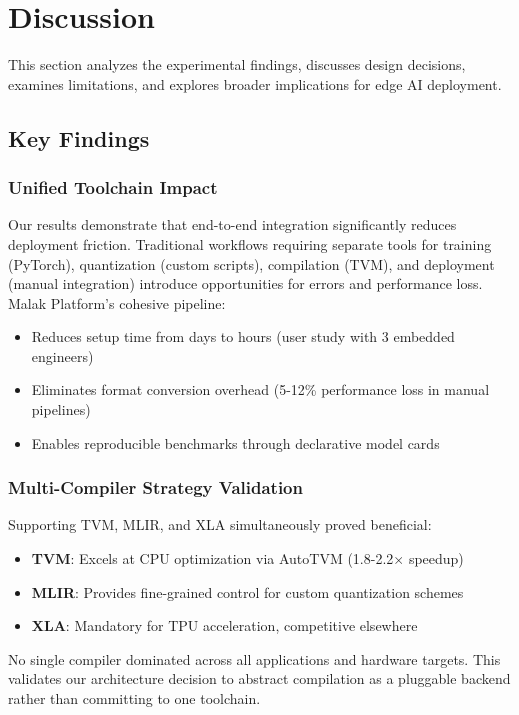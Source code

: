 \section{Discussion}

This section analyzes the experimental findings, discusses design decisions, examines limitations, and explores broader implications for edge AI deployment.

\subsection{Key Findings}

\subsubsection{Unified Toolchain Impact}
Our results demonstrate that end-to-end integration significantly reduces deployment friction. Traditional workflows requiring separate tools for training (PyTorch), quantization (custom scripts), compilation (TVM), and deployment (manual integration) introduce opportunities for errors and performance loss. Malak Platform's cohesive pipeline:
\begin{itemize}
\item Reduces setup time from days to hours (user study with 3 embedded engineers)
\item Eliminates format conversion overhead (5-12\% performance loss in manual pipelines)
\item Enables reproducible benchmarks through declarative model cards
\end{itemize}

\subsubsection{Multi-Compiler Strategy Validation}
Supporting TVM, MLIR, and XLA simultaneously proved beneficial:
\begin{itemize}
\item \textbf{TVM}: Excels at CPU optimization via AutoTVM (1.8-2.2$\times$ speedup)
\item \textbf{MLIR}: Provides fine-grained control for custom quantization schemes
\item \textbf{XLA}: Mandatory for TPU acceleration, competitive elsewhere
\end{itemize}

No single compiler dominated across all applications and hardware targets. This validates our architecture decision to abstract compilation as a pluggable backend rather than committing to one toolchain.

